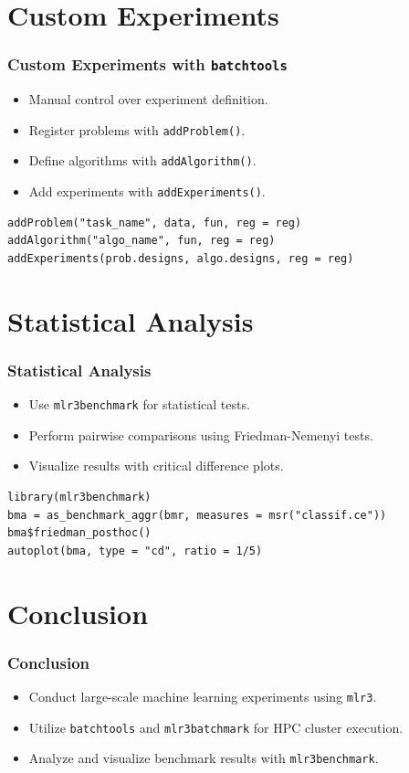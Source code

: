 \documentclass{beamer}
\begin{document}
\section{Custom Experiments}
\begin{frame}[fragile]
\frametitle{Custom Experiments with \texttt{batchtools}}
\begin{itemize}
    \item Manual control over experiment definition.
    \item Register problems with \texttt{addProblem()}.
    \item Define algorithms with \texttt{addAlgorithm()}.
    \item Add experiments with \texttt{addExperiments()}.
\end{itemize}
\begin{verbatim}
addProblem("task_name", data, fun, reg = reg)
addAlgorithm("algo_name", fun, reg = reg)
addExperiments(prob.designs, algo.designs, reg = reg)
\end{verbatim}
\end{frame}

\section{Statistical Analysis}
\begin{frame}[fragile]
\frametitle{Statistical Analysis}
\begin{itemize}
    \item Use \texttt{mlr3benchmark} for statistical tests.
    \item Perform pairwise comparisons using Friedman-Nemenyi tests.
    \item Visualize results with critical difference plots.
\end{itemize}
\begin{verbatim}
library(mlr3benchmark)
bma = as_benchmark_aggr(bmr, measures = msr("classif.ce"))
bma$friedman_posthoc()
autoplot(bma, type = "cd", ratio = 1/5)
\end{verbatim}
\end{frame}

\section{Conclusion}
\begin{frame}
\frametitle{Conclusion}
\begin{itemize}
    \item Conduct large-scale machine learning experiments using \texttt{mlr3}.
    \item Utilize \texttt{batchtools} and \texttt{mlr3batchmark} for HPC cluster execution.
    \item Analyze and visualize benchmark results with \texttt{mlr3benchmark}.
\end{itemize}
\end{frame}
\end{document}
